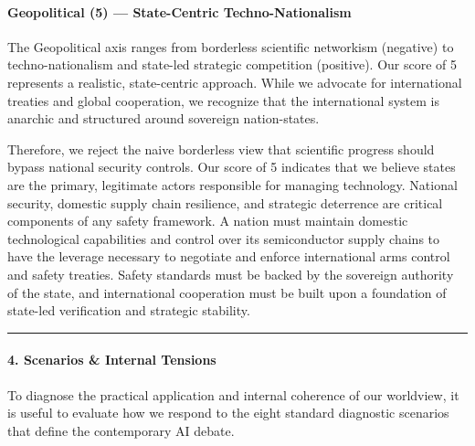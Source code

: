 \paragraph{Geopolitical (5) --- State-Centric
Techno-Nationalism}\label{geopolitical-5-state-centric-techno-nationalism}

The Geopolitical axis ranges from borderless scientific networkism
(negative) to techno-nationalism and state-led strategic competition
(positive). Our score of 5 represents a realistic, state-centric
approach. While we advocate for international treaties and global
cooperation, we recognize that the international system is anarchic and
structured around sovereign nation-states.

Therefore, we reject the naive borderless view that scientific progress
should bypass national security controls. Our score of 5 indicates that
we believe states are the primary, legitimate actors responsible for
managing technology. National security, domestic supply chain
resilience, and strategic deterrence are critical components of any
safety framework. A nation must maintain domestic technological
capabilities and control over its semiconductor supply chains to have
the leverage necessary to negotiate and enforce international arms
control and safety treaties. Safety standards must be backed by the
sovereign authority of the state, and international cooperation must be
built upon a foundation of state-led verification and strategic
stability.

\begin{center}\rule{0.5\linewidth}{0.5pt}\end{center}

\paragraph{4. Scenarios \& Internal
Tensions}\label{scenarios-internal-tensions-1}

To diagnose the practical application and internal coherence of our
worldview, it is useful to evaluate how we respond to the eight standard
diagnostic scenarios that define the contemporary AI debate.

